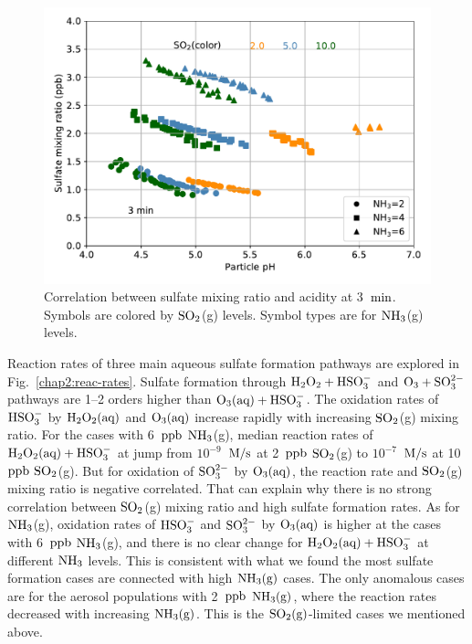 \documentclass[edeposit,fullpage]{uiucthesis2009}
\makeatletter
\DeclareRobustCommand*\unit[1]
 {\ensuremath{%
   {\thinmuskip3mu\relax
    \def\mu{\text{\textmu}}\def~{\,}%
    \ifx\f@series\testbx\mathbf{#1}\else\mathrm{#1}\fi}}}
\makeatother
\begin{document}
\begin{figure}[ht]
    \centering \includegraphics[scale=0.6]{chap2_figs/chap2_fig4_sulfate_pH_3min.pdf}
    \caption{Correlation between sulfate mixing ratio and acidity at 3~\unit{min}. Symbols are colored by $\rm SO_2$(g) levels. Symbol types are for $\rm NH_3$(g) levels.}
    \label{chap2:su-acidity}
\end{figure}

Reaction rates of three main aqueous sulfate formation pathways are explored in Fig.~\ref{chap2:reac-rates}. Sulfate formation through $\rm H_2O_2+ HSO_3^-$ and $\rm O_3+ SO_3^{2-}$ pathways are 1--2 orders higher than $\rm O_3(aq) + HSO_3^-$. The oxidation rates of $\rm HSO_3^-$ by $\rm H_2O_2(aq)$ and $\rm O_3(aq)$ increase rapidly with increasing $\rm SO_2$(g) mixing ratio. For the cases with 6~\unit{ppb} $\rm NH_3$(g), median reaction rates of $\rm H_2O_2(aq) + HSO_3^-$ at jump from $10^{-9}$~\unit{M/s} at 2~\unit{ppb} $\rm SO_2$(g) to $10^{-7}$~\unit{M/s} at 10~\unit{ppb} $\rm SO_2$(g). But for oxidation of $\rm SO_3^{2-}$ by $\rm O_3(aq)$, the reaction rate and $\rm SO_2$(g) mixing ratio is negative correlated. That can explain why there is no strong correlation between $\rm SO_2$(g) mixing ratio and high sulfate formation rates. As for $\rm NH_3$(g), oxidation rates of $\rm HSO_3^-$ and $\rm SO_3^{2-}$ by $\rm O_3(aq)$ is higher at the cases with 6~\unit{ppb} $\rm NH_3$(g), and there is no clear change for $\rm H_2O_2(aq) + HSO_3^-$ at different $\rm NH_3$ levels. This is consistent with what we found the most sulfate formation cases are connected with high $\rm NH_3(g)$ cases. The only anomalous cases are for the aerosol populations with 2~\unit{ppb} $\rm NH_3(g)$, where the reaction rates decreased with increasing $\rm NH_3(g)$. This is the $\rm SO_2(g)$-limited cases we mentioned above. 
\end{document}
